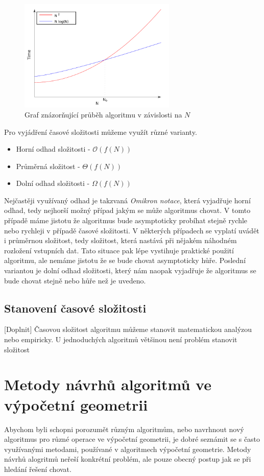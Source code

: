 \begin{figure}[h]
  \centering
  \includegraphics[width=7.5cm]{./pictures/3/time_complexity.pdf}
  \caption{Graf znázorňující průběh algoritmu v závislosti na $N$}
  \label{fig:3-time_complexity}
\end{figure}
	
	
	 Pro vyjádření časové složitosti můžeme využít různé varianty.
\begin{itemize}
	\item Horní odhad složitosti - $\mathcal{O} (f(N))$
	\item Průměrná složitost - $\Theta (f(N))$
	\item Dolní odhad složitosti - $\Omega (f(N))$
\end{itemize}	
	Nejčastěji využívaný odhad je takzvaná \textit{Omikron notace}, která vyjadřuje horní odhad, tedy nejhorší možný případ jakým se může algoritmus chovat. V tomto případě máme jistotu že algoritmus bude asymptoticky probíhat stejně rychle nebo rychleji v případě časové složitosti. V některých případech se vyplatí uvádět i průměrnou složitost, tedy složitost, která nastává při nějakém náhodném rozložení vstupních dat. Tato situace pak lépe vystihuje praktické použití algoritmu, ale nemáme jistotu že se bude chovat asymptoticky hůře. Poslední variantou je dolní odhad složitosti, který nám naopak vyjadřuje že algoritmus se bude chovat stejně nebo hůře než je uvedeno.
	
\subsection{Stanovení časové složitosti}
	[Doplnit] Časovou složitost algoritmu můžeme stanovit matematickou analýzou nebo empiricky. U jednoduchých algoritmů většinou není problém stanovit složitost
	
	
	
	
\section{Metody návrhů algoritmů ve výpočetní geometrii}
	Abychom byli schopni porozumět různým algoritmům, nebo navrhnout nový algoritmus pro různé operace ve výpočetní geometrii, je dobré seznámit se s často využívanými metodami, používané v algoritmech výpočetní geometrie. Metody návrhů alogritmů neřeší konkrétní problém, ale pouze obecný postup jak se při hledání řešení chovat.


